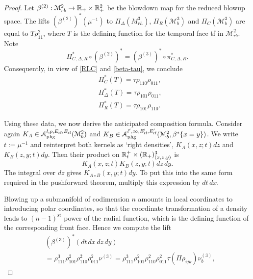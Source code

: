 \begin{proof}
Let $\beta^{(2)}: \mathscr{M}^2_{rb} \to \R_+ \times \R_+^2$ be the 
blowdown map for the reduced blowup space. The lifts $\left(\beta^{(2)}\right)^*(\mu^{-1})$ 
to $\Pi_\Delta(M^3_{rh})$, $\Pi_R(\mathscr{M}^3_b)$ and $\Pi_C(\mathscr{M}^3_b)$ are 
equal to $T \rho_{11}^2$, where $T$ is the defining function 
for the temporal face tf in $\mathscr{M}^2_{rb}$. Note 
\[
\Pi^*_{C,\Delta,R} \circ \left(\beta^{(2)}\right)^* = \left(\beta^{(3)}\right)^* \circ \pi^*_{C,\Delta,R}.
\]
Consequently, in view of \eqref{RLC} and \eqref{beta-tau}, we conclude
\begin{equation}
\begin{split}
&\Pi_C^*(T)=\tau \rho_{110} \rho_{011}, \\
&\Pi_\Delta^*(T)=\tau \rho_{101} \rho_{011}, \\
&\Pi_R^*(T)=\tau \rho_{101} \rho_{110}.
\end{split}
\end{equation}

Using these data, we now derive the anticipated composition formula. 
Consider again $K_A \in \mathscr{A}_{\textup{phg}}^{l,p,E_{\textup{rf}}, E_{\textup{rf}}}(\mathscr{M}^2_b)$ 
and $K_B \in \mathscr{A}_{\textup{phg}}^{l',\infty,E'_{\textup{rf}}, E'_{\textup{rf}}}(\mathscr{M}^2_b,\beta^*\{x=y\})$. 
We write $t:=\mu^{-1}$ and reinterpret both kernels as `right densities', 
$K_A(x,z;t) dz$ and $K_B(z,y;t) dy$. Then their product on $\R^+_t \times (\R_+)^3_{(x,z,y)}$ is
\[
K_A(x,z;t) K_B(z,y;t) dz \, dy.
\]
The integral over $dz$ gives $K_{A\circ B}(x,y;t) dy$. To put this into the same form required
in the pushforward theorem, multiply this expression by $dt \, dx$. 

Blowing up a submanifold of codimension $n$ amounts in local coordinates to introducing polar coordinates, so that 
the coordinate transformation of a density leads to $(n-1)^{\mathrm{st}}$ power of the radial function, which 
is the defining function of the corresponding front face. Hence we compute the lift
\begin{equation}
\begin{split}
&(\beta^{(3)})^* (dt \, dx \, dz \, dy) \\
&=\rho_{111}^{3}\rho_{101}^{2}\rho_{110}^{2}\rho_{011}^{2} 
\nu^{(3)}=\rho_{111}^{3}\rho_{101}^{2}\rho_{110}^{2}\rho_{011}^{2} 
\tau \left( \Pi \rho_{ijk} \right) \nu^{(3)}_b,
\end{split}
\label{lift1}
\end{equation}


\end{proof}

